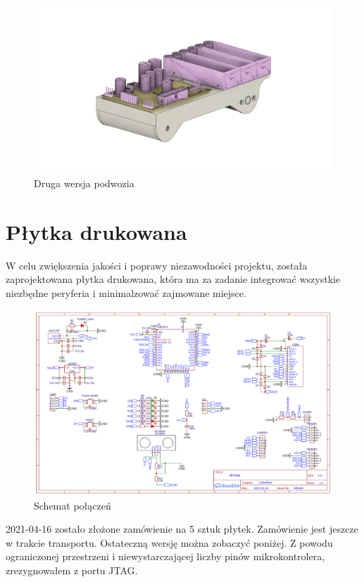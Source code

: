 \documentclass[10pt, a4paper]{article}
\begin{document}
\begin{figure}[H]
	\centering
	\includegraphics[width=1\textwidth]{figures/chassisV2.png}
	\caption{Druga wersja podwozia}
	\label{fig:chassisv2}
\end{figure}


\section{Płytka drukowana}
W celu zwiększenia jakości i poprawy niezawodności projektu, 
została zaprojektowana płytka drukowana, która ma za zadanie
integrować wszystkie niezbędne peryferia i minimalzować zajmowane miejsce. 

\begin{figure}[H]
	\centering
	\includegraphics[width=1\textwidth]{figures/schematic.png}
	\caption{Schemat połączeń}
	\label{fig:schematic}
\end{figure}

2021-04-16 zostało złożone zamówienie na 5 sztuk płytek.
Zamówienie jest jeszcze w trakcie transportu. Ostateczną wersję 
można zobaczyć poniżej. Z powodu ograniczonej przestrzeni i
niewystarczającej liczby pinów mikrokontrolera, zrezygnowałem z
portu JTAG.
\end{document}
